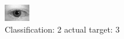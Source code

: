 \begin{figure}[h!]
\begin{center}
\includegraphics[width=0.60\columnwidth]{figures/ID587_class_2_target_3.png}
\end{center}
\caption{ Classification: 2 actual target: 3}
\label{fig:ID587_class_2_target_3}
\end{figure}
